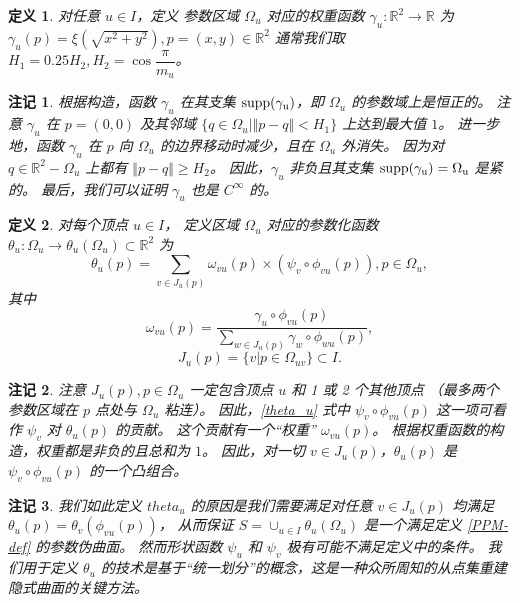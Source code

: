 \documentclass{ctexart}
\newtheorem{Def}{定义}
\newtheorem{Rmk}{注记}
\begin{document}
		\begin{Def}\label{WF-def}
			对任意 $u\in I$，定义
			参数区域 $\Omega_u$ 对应的权重函数 $\gamma_u:\mathbb{R}^2\rightarrow \mathbb{R}$ 为
			$\gamma_u(p) = \xi(\sqrt{x^2+y^2}),p=(x,y)\in \mathbb{R}^2$
			通常我们取 $H_1=0.25H_2,H_2=\cos\dfrac{\pi}{m_u}$。
		\end{Def}

		\begin{Rmk}
			根据构造，函数 $\gamma_u$ 在其支集 $\rm{supp}(\gamma_u)$，即 $\Omega_u$ 的参数域上是恒正的。
			注意 $\gamma_u$ 在 $p=(0,0)$ 及其邻域 $\{q\in \Omega_u|\Vert p-q\Vert < H_1\}$ 上达到最大值 $1$。
			进一步地，函数 $\gamma_u$ 在 $p$ 向 $\Omega_u$ 的边界移动时减少，且在 $\Omega_u$ 外消失。
			因为对 $q\in \mathbb{R}^2-\Omega_u$ 上都有 $\Vert p-q\Vert \geq H_2$。
			因此，$\gamma_u$ 非负且其支集 $\rm{supp}(\gamma_u)=\Omega_u$ 是紧的。
			最后，我们可以证明 $\gamma_u$ 也是 $C^{\infty}$ 的。
		\end{Rmk}

		\begin{Def}\label{PF-def}
			对每个顶点 $u\in I$，
			定义区域 $\Omega_u$ 对应的参数化函数 $\theta_u:\Omega_u\rightarrow \theta_u(\Omega_u)\subset \mathbb{R}^2$ 为
			\begin{equation}\label{theta_u}
				\theta_u(p) = \sum_{v\in J_u(p)} \omega_{vu}(p)\times (\psi_v\circ \phi_{vu}(p)),p\in \Omega_u,
			\end{equation}
			其中
			\begin{equation}
				\omega_{vu}(p) = \dfrac{\gamma_u\circ \phi_{vu}(p)}{\sum_{w\in J_u(p)}\gamma_w\circ \phi_{wu}(p)},
			\end{equation}
			\begin{equation}
				J_u(p) = \{v|p\in \Omega_{uv}\} \subset I.
			\end{equation}
		\end{Def}

		\begin{Rmk}
			注意 $J_u(p),p\in \Omega_u$ 一定包含顶点 $u$ 和 1 或 2 个其他顶点
			（最多两个参数区域在 $p$ 点处与 $\Omega_u$ 粘连）。
			因此，\ref{theta_u} 式中 $\psi_v\circ \phi_{vu}(p)$ 这一项可看作 $\psi_v$ 对 $\theta_u(p)$ 的贡献。
			这个贡献有一个“权重” $\omega_{vu}(p)$。
			根据权重函数的构造，权重都是非负的且总和为 $1$。
			因此，对一切 $v\in J_u(p)$，$\theta_u(p)$ 是 $\psi_v\circ \phi_{vu}(p)$ 的一个凸组合。
		\end{Rmk}

		\begin{Rmk}
			我们如此定义 $theta_u$ 的原因是我们需要满足对任意 $v\in J_u(p)$ 均满足 $\theta_u(p) = \theta_v(\phi_{vu}(p))$，
			从而保证 $S = \cup_{u\in I}\theta_u(\Omega_u)$ 是一个满足定义 \ref{PPM-def} 的参数伪曲面。
			然而形状函数 $\psi_u$ 和 $\psi_v$ 极有可能不满足定义中的条件。
			我们用于定义 $\theta_u$ 的技术是基于“统一划分”的概念，这是一种众所周知的从点集重建隐式曲面的关键方法。
		\end{Rmk}
\end{document}
